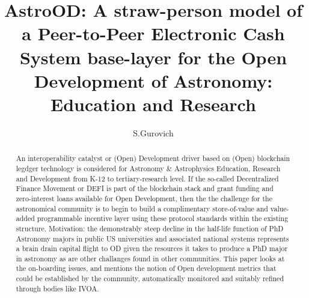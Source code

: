 \documentclass[final,5p,times,twocolumn,authoryear]{elsarticle}
\begin{document}
\begin{frontmatter}

\title{ AstroOD: A straw-person model of a Peer-to-Peer Electronic Cash System base-layer for the Open Development of Astronomy: Education and Research}
 
    \author[iate,wsu]{S.Gurovich}
  
\address[iate]{
   Instituto De Astronom\'ia Te\'orica y Experimental -
   Observatorio Astron\'omico C\'ordoba (IATE--OAC--UNC--CONICET),
   Laprida 854, X5000BGR, C\'ordoba, Argentina}
\address[wsu]{
   Western Sydney University, Kingswood campus, NSW, Australia
}

\begin{abstract}

An interoperability catalyst or (Open) Development driver based on (Open) blockchain legdger technology is considered for Astronomy & Astrophysics Education, Research and Development from K-12 to tertiary-research level. If the so-called Decentralized Finance Movement or DEFI is part of the blockchain stack and grant funding and zero-interest loans available for Open Development, then the the challenge for the astronomical community is to begin to build a complimentary store-of-value and value-added programmable incentive layer using these protocol standards within the existing structure. Motivation: the demonstrably steep decline in the half-life function of PhD Astronomy majors in public US universities and associated national systems represents a brain drain capital flight to OD given the resources it takes to produce a PhD major in astronomy as are other challanges found in other communities. This paper looks at the on-boarding issues, and mentions the notion of Open development metrics that could be established by the community, automatically monitored and suitably refined through bodies like IVOA. 


\end{abstract}
\end{frontmatter}
\end{document}
